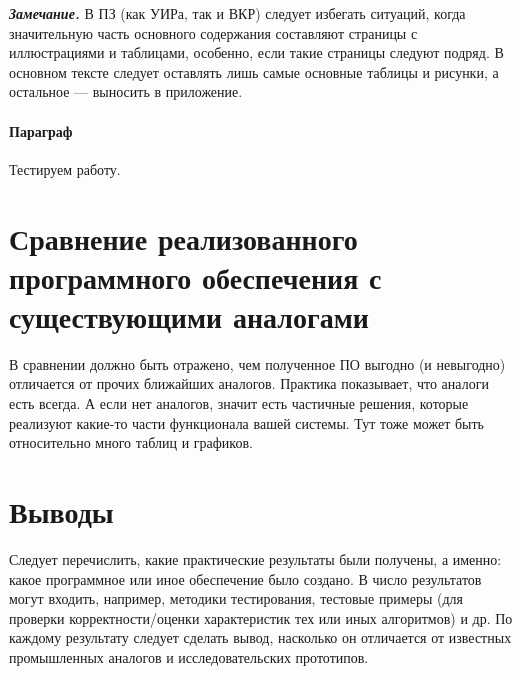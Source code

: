\textit{\textbf{Замечание.}} В ПЗ (как УИРа, так и ВКР) следует избегать ситуаций, когда значительную часть основного содержания составляют страницы с иллюстрациями и таблицами, особенно, если такие страницы следуют подряд. В основном тексте следует оставлять лишь самые основные таблицы и рисунки, а остальное --- выносить в приложение.

\paragraph{Параграф} Тестируем работу.


\section{Сравнение реализованного программного обеспечения с существующими аналогами}

В сравнении должно быть отражено, чем полученное ПО выгодно (и невыгодно) отличается от прочих ближайших аналогов. Практика показывает, что аналоги есть всегда. А если нет аналогов, значит есть частичные решения, которые реализуют какие-то части функционала вашей системы. Тут тоже может быть относительно много таблиц и графиков.



\section{Выводы}

Следует перечислить, какие практические результаты были получены, а именно: какое программное или иное обеспечение было создано. В число результатов могут входить, например, методики тестирования, тестовые примеры (для проверки корректности/оценки характеристик тех или иных алгоритмов) и др. По каждому результату следует сделать вывод, насколько он отличается от известных промышленных аналогов и исследовательских прототипов.

